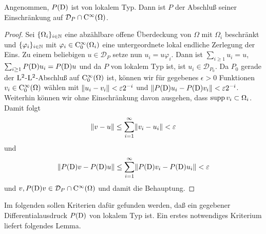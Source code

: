 %
%
%

\begin{thm}
   Angenommen, $P(\mathrm D)$ ist von lokalem Typ. Dann ist $P$ der Abschluß seiner Einschränkung auf $\mathcal D_P\cap \mathrm C^\infty(\Omega)$.
\end{thm}
\begin{proof}
Sei $\{\Omega_i\}_{i\in \mathbb N}$ eine abzählbare offene Überdeckung von $\Omega$ mit $\Omega_i$ beschränkt  und $\{\varphi_i\}_{i\in \mathbb N}$ mit $\varphi_i\in \mathrm C_0^\infty (\Omega_i)$ eine untergeordnete lokal endliche Zerlegung der Eins. Zu einem beliebigen $u\in\mathcal{D}_P$ setze nun $u_i=u\varphi_i$. Dann ist $\sum_{i\geq 1} u_i=u$, $\sum_{i\geq 1} P(\mathrm D)u_i=P(\mathrm D)u$ und da $P$ von lokalem Typ ist, ist $u_i\in\mathcal{D}_{P_0}$. Da $P_0$ gerade der $\mathrm L^2$-$\mathrm L^2$-Abschluß auf $\mathrm C_0^\infty(\Omega)$ ist, können wir für gegebenes $\epsilon>0$ Funktionen $v_i\in \mathrm C_0^\infty(\Omega)$ wählen mit $\lVert u_i-v_i\rVert<\varepsilon 2^{-i}$ und $\lVert P(\mathrm D)u_i-P(\mathrm D)v_i\rVert<\varepsilon 2^{-i}$. Weiterhin können wir ohne Einschränkung davon ausgehen, dass $\operatorname{supp} v_i \subset \Omega_i$. Damit folgt
\begin{equation}
\lVert v-u\rVert\leq \sum_{i=1}^\infty \lVert v_i-u_i\rVert < \varepsilon
\end{equation}
und
\begin{equation}
\lVert P(\mathrm D)v-P(\mathrm D)u\rVert\leq \sum_{i=1}^\infty \lVert P(\mathrm D)v_i-P(\mathrm D)u_i\rVert < \varepsilon
\end{equation}
und $v,P(\mathrm D)v\in \mathcal D_P\cap \mathrm C^\infty(\Omega)$ und damit die Behauptung.
\end{proof}

%
%

Im folgenden sollen Kriterien dafür gefunden werden, daß ein gegebener Differentialausdruck $P(\mathrm D)$ von lokalem Typ ist. Ein erstes notwendiges Kriterium liefert folgendes Lemma.

